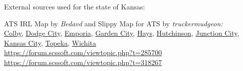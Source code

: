
















\vspace{2em}\footnoterule
{\footnotesize \noindent External sources used for the state of Kansas:
\begin{description}[
style=nextline,
leftmargin=1.1em,
labelsep=0pt,
parsep=0pt,
font=\normalfont,
]

\item[$\ast$]
ATS IRL Map by \textit{Bedavd} and Slippy Map for ATS by \textit{truckermudgeon:}\\
\hyperref[city:Colby]{Colby},
\hyperref[city:Dodge City]{Dodge City},
\hyperref[city:Emporia]{Emporia},
\hyperref[city:Garden City]{Garden City},
\hyperref[city:Hays]{Hays},
\hyperref[city:Hutchinson]{Hutchinson},
\hyperref[city:Junction City]{Junction City},
\hyperref[city:kansas_ci_ks]{Kansas City},
\hyperref[city:Topeka]{Topeka},
\hyperref[city:Wichita]{Wichita}
\\ \url{https://forum.scssoft.com/viewtopic.php?t=285700}
\\ \url{https://forum.scssoft.com/viewtopic.php?t=318267}

\end{description}
}
